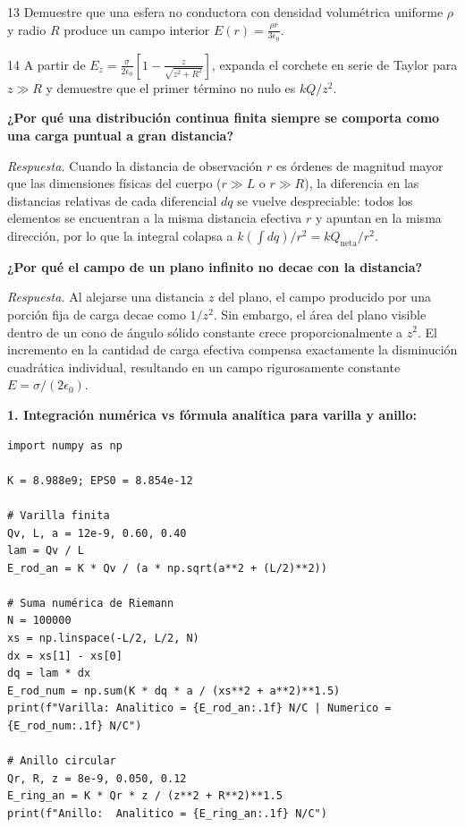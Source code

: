 \documentclass[11pt]{article}
\begin{document}
\begin{eReto}{13 }
Demuestre que una esfera no conductora con densidad volumétrica uniforme $\rho$ y radio $R$ produce un campo interior $E(r)=\frac{\rho r}{3\epsilon_0}$.
\end{eReto}

\begin{eReto}{14 }
A partir de $E_z=\frac{\sigma}{2\epsilon_0}\left[1-\frac{z}{\sqrt{z^2+R^2}}\right]$, expanda el corchete en serie de Taylor para $z\gg R$ y demuestre que el primer término no nulo es $kQ/z^2$.
\end{eReto}


\begin{eTeoria}
\textbf{¿Por qué una distribución continua finita siempre se comporta como una carga puntual a gran distancia?}\par
\emph{Respuesta.} Cuando la distancia de observación $r$ es órdenes de magnitud mayor que las dimensiones físicas del cuerpo ($r\gg L$ o $r\gg R$), la diferencia en las distancias relativas de cada diferencial $dq$ se vuelve despreciable: todos los elementos se encuentran a la misma distancia efectiva $r$ y apuntan en la misma dirección, por lo que la integral colapsa a $k(\int dq)/r^2 = kQ_{\text{neta}}/r^2$.
\end{eTeoria}

\begin{eTeoria}
\textbf{¿Por qué el campo de un plano infinito no decae con la distancia?}\par
\emph{Respuesta.} Al alejarse una distancia $z$ del plano, el campo producido por una porción fija de carga decae como $1/z^2$. Sin embargo, el área del plano visible dentro de un cono de ángulo sólido constante crece proporcionalmente a $z^2$. El incremento en la cantidad de carga efectiva compensa exactamente la disminución cuadrática individual, resultando en un campo rigurosamente constante $E=\sigma/(2\epsilon_0)$.
\end{eTeoria}


\textbf{1. Integración numérica vs fórmula analítica para varilla y anillo:}
\begin{lstlisting}[style=e10python]
import numpy as np

K = 8.988e9; EPS0 = 8.854e-12

# Varilla finita
Qv, L, a = 12e-9, 0.60, 0.40
lam = Qv / L
E_rod_an = K * Qv / (a * np.sqrt(a**2 + (L/2)**2))

# Suma numérica de Riemann
N = 100000
xs = np.linspace(-L/2, L/2, N)
dx = xs[1] - xs[0]
dq = lam * dx
E_rod_num = np.sum(K * dq * a / (xs**2 + a**2)**1.5)
print(f"Varilla: Analitico = {E_rod_an:.1f} N/C | Numerico = {E_rod_num:.1f} N/C")

# Anillo circular
Qr, R, z = 8e-9, 0.050, 0.12
E_ring_an = K * Qr * z / (z**2 + R**2)**1.5
print(f"Anillo:  Analitico = {E_ring_an:.1f} N/C")
\end{lstlisting}
\end{document}
